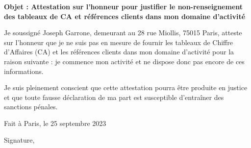 \documentclass[12pt,a4paper]{article}
\begin{document}
\begin{center}
\textbf{Objet : Attestation sur l'honneur pour justifier le non-renseignement des tableaux de CA et références clients dans mon domaine d'activité}
\end{center}

\vspace{1cm}

Je soussigné Joseph Garrone, demeurant au 28 rue Miollis, 75015 Paris, atteste sur l'honneur que je ne suis pas en mesure de fournir les tableaux de Chiffre d'Affaires (CA) et les références clients dans mon domaine d'activité pour la raison suivante : je commence mon activité et ne dispose donc pas encore de ces informations.

\vspace{1cm}

Je suis pleinement conscient que cette attestation pourra être produite en justice et que toute fausse déclaration de ma part est susceptible d'entraîner des sanctions pénales.

\vspace{1cm}

\begin{flushright}
Fait à Paris, le 25 septembre 2023

\vspace{1cm}

Signature,

\end{flushright}
\end{document}
